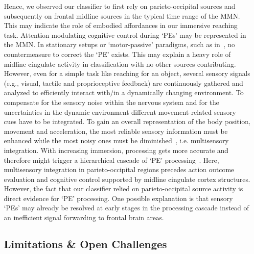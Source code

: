 Hence, we observed our classifier to first rely on parieto-occipital sources and subsequently on frontal midline sources in the typical time range of the MMN. This may indicate the role of embodied affordances in our immersive reaching task. Attention modulating cognitive control during `PEs' may be represented in the MMN. In stationary setups or `motor-passive' paradigms, such as in~\cite{Zander2016-ed}, no countermeasure to correct the `PE' exists. This may explain a heavy role of midline cingulate activity in classification with no other sources contributing. However, even for a simple task like reaching for an object, several sensory signals (e.g., visual, tactile and proprioceptive feedback) are continuously gathered and analyzed to efficiently interact with/in a dynamically changing environment. To compensate for the sensory noise within the nervous system and for the uncertainties in the dynamic environment different movement-related sensory cues have to be integrated. To gain an overall representation of the body position, movement and acceleration, the most reliable sensory information must be enhanced while the most noisy ones must be diminished~\cite{Fetsch2011-bp}, i.e. multisensory integration. With increasing immersion, processing gets more accurate and therefore might trigger a hierarchical cascade of `PE' processing~\cite{Singh2021-qc}. Here, multisensory integration in parieto-occipital regions precedes action outcome evaluation and cognitive control supported by midline cingulate cortex structures. However, the fact that our classifier relied on parieto-occipital source activity is direct evidence for `PE' processing. One possible explanation is that sensory `PEs' may already be resolved at early stages in the processing cascade instead of an inefficient signal forwarding to frontal brain areas.

\subsection{Limitations \& Open Challenges}


